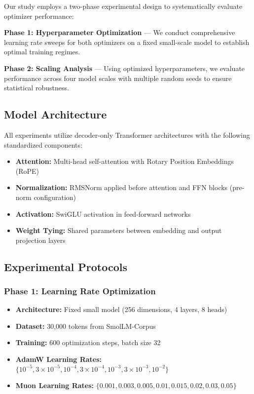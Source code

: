 \documentclass[11pt,a4paper]{article}
\begin{document}
Our study employs a two-phase experimental design to systematically evaluate optimizer performance:

\textbf{Phase 1: Hyperparameter Optimization} — We conduct comprehensive learning rate sweeps for both optimizers on a fixed small-scale model to establish optimal training regimes.

\textbf{Phase 2: Scaling Analysis} — Using optimized hyperparameters, we evaluate performance across four model scales with multiple random seeds to ensure statistical robustness.

\subsection{Model Architecture}

All experiments utilize decoder-only Transformer architectures with the following standardized components:
\begin{itemize}[leftmargin=*]
    \item \textbf{Attention:} Multi-head self-attention with Rotary Position Embeddings (RoPE) \cite{su2021roformer}
    \item \textbf{Normalization:} RMSNorm applied before attention and FFN blocks (pre-norm configuration)
    \item \textbf{Activation:} SwiGLU activation in feed-forward networks
    \item \textbf{Weight Tying:} Shared parameters between embedding and output projection layers
\end{itemize}

\subsection{Experimental Protocols}

\subsubsection{Phase 1: Learning Rate Optimization}
\begin{itemize}[leftmargin=*]
    \item \textbf{Architecture:} Fixed small model (256 dimensions, 4 layers, 8 heads)
    \item \textbf{Dataset:} 30,000 tokens from SmolLM-Corpus
    \item \textbf{Training:} 600 optimization steps, batch size 32
    \item \textbf{AdamW Learning Rates:} $\{10^{-5}, 3 \times 10^{-5}, 10^{-4}, 3 \times 10^{-4}, 10^{-3}, 3 \times 10^{-3}, 10^{-2}\}$
    \item \textbf{Muon Learning Rates:} $\{0.001, 0.003, 0.005, 0.01, 0.015, 0.02, 0.03, 0.05\}$
\end{itemize}
\end{document}

